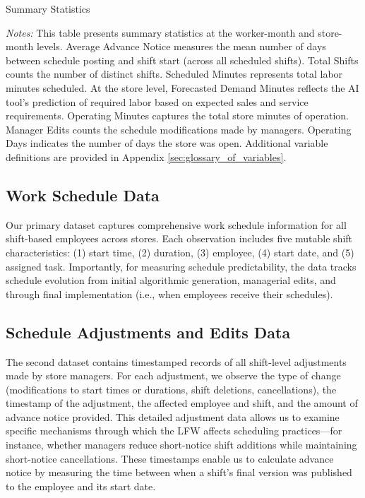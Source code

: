 \documentclass[letterpaper,11pt,leqno]{article}
\theoremstyle{paper}
\newcommand{\note}[2][]{\parbox{\textwidth}{\footnotesize\vspace*{10pt}\textit{#1}#2}}
\begin{document}
\begin{singlespace}
\begin{table}[h]
\caption{Summary Statistics}

\note{\textit{Notes:} \scriptsize This table presents summary statistics at the worker-month and store-month levels. Average Advance Notice measures the mean number of days between schedule posting and shift start (across all scheduled shifts). Total Shifts counts the number of distinct shifts. Scheduled Minutes represents total labor minutes scheduled. At the store level, Forecasted Demand Minutes reflects the AI tool's prediction of required labor based on expected sales and service requirements. Operating Minutes captures the total store minutes of operation. Manager Edits counts the schedule modifications made by managers. Operating Days indicates the number of days the store was open. Additional variable definitions are provided in Appendix \ref{sec:glossary_of_variables}.}
\label{table:sum_stats_all}
\end{table}
\end{singlespace}


\subsection{Work Schedule Data} \label{subsec:data_versions}
Our primary dataset captures comprehensive work schedule information for all shift-based employees across stores. Each observation includes five mutable shift characteristics: (1) start time, (2) duration, (3) employee, (4) start date, and (5) assigned task. Importantly, for measuring schedule predictability, the data tracks schedule evolution from initial algorithmic generation, managerial edits, and through final implementation (i.e., when employees receive their schedules). 

\subsection{Schedule Adjustments and Edits Data} \label{subsec:data_adjustments}
The second dataset contains timestamped records of all shift-level adjustments made by store managers. For each adjustment, we observe the type of change (modifications to start times or durations, shift deletions, cancellations), the timestamp of the adjustment, the affected employee and shift, and the amount of advance notice provided. This detailed adjustment data allows us to examine specific mechanisms through which the LFW affects scheduling practices—for instance, whether managers reduce short-notice shift additions while maintaining short-notice cancellations. These timestamps enable us to calculate advance notice by measuring the time between when a shift's final version was published to the employee and its start date.
\end{document}

